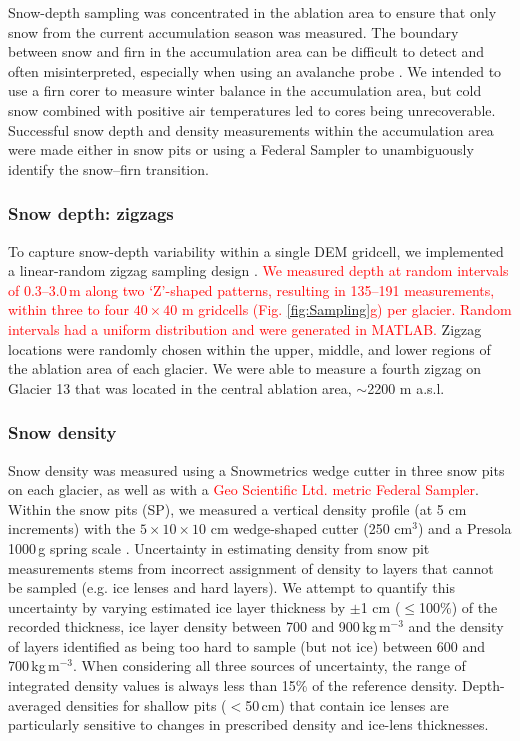 \documentclass[twocolumn, letterpaper]{igs}
\begin{document}
Snow-depth sampling was concentrated in the ablation area to ensure that only snow from the current accumulation season was measured. The boundary between snow and firn in the accumulation area can be difficult to detect and often misinterpreted, especially when using an avalanche probe \citep{Grunewald2010,Sold2013}. We intended to use a firn corer to measure winter balance in the accumulation area, but cold snow combined with positive air temperatures led to cores being unrecoverable. Successful snow depth and density measurements within the accumulation area were made either in snow pits or using a Federal Sampler to unambiguously identify the snow--firn transition. 

\subsubsection{Snow depth: zigzags}

To capture snow-depth variability within a single DEM gridcell, we implemented a linear-random zigzag sampling design \citep{Shea2010}. \textcolor{red}{We measured depth at random intervals of 0.3--3.0\,m along two `Z'-shaped patterns, resulting in 135--191 measurements, within three to four $40\times40$ m gridcells (Fig. \ref{fig:Sampling}g) per glacier. Random intervals had a uniform distribution and were generated in MATLAB.} Zigzag locations were randomly chosen within the upper, middle, and lower regions of the ablation area of each glacier. We were able to measure a fourth zigzag on Glacier 13 that was located in the central ablation area, $\sim$2200 m a.s.l.

\subsubsection{Snow density}

Snow density was measured using a Snowmetrics wedge cutter in three snow pits on each glacier, as well as with a \textcolor{red}{Geo Scientific Ltd. metric Federal Sampler}. Within the snow pits (SP), we measured a vertical density profile (at 5 cm increments) with the $5\times10\times 10$ cm wedge-shaped cutter (250 cm$^3$) and a Presola 1000\,g spring scale \citep[e.g.][]{Gray1981,Fierz2009}. Uncertainty in estimating density from snow pit measurements stems from incorrect assignment of density to layers that cannot be sampled (e.g. ice lenses and hard layers). We attempt to quantify this uncertainty by varying estimated ice layer thickness by $\pm$1 cm ($\leq$100\%) of the recorded thickness, ice layer density between 700 and 900\,kg\,m$^{-3}$ and the density of layers identified as being too hard to sample (but not ice) between 600 and 700\,kg\,m$^{-3}$. When considering all three sources of uncertainty, the range of integrated density values is always less than 15\% of the reference density. Depth-averaged densities for shallow pits ($<$50\,cm) that contain ice lenses are particularly sensitive to changes in prescribed density and ice-lens thicknesses. 
\end{document}

